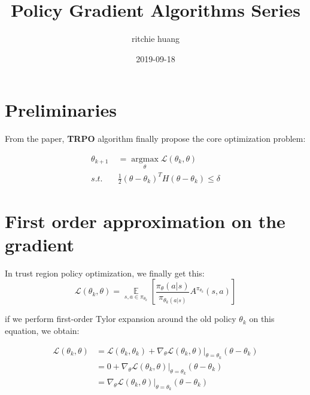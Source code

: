 \documentclass[a4paper, titlepage, 12pt]{article}
\title{Policy Gradient Algorithms Series}
\author{ritchie huang}
\date{2019-09-18}
\begin{document}
\maketitle 

\tableofcontents
\newpage

\section{Preliminaries}
From the paper, \textbf{TRPO} algorithm finally propose the core optimization problem:

\begin{equation}
    \begin{aligned}
    \theta_{k + 1} &= \mathop{argmax} \limits_{\theta} \mathcal{L}(\theta_{k}, \theta) \\
               s.t.\quad&\frac{1}{2} (\theta - \theta_{k})^{T} H (\theta - \theta_{k}) \leq \delta 
    \end{aligned}
\end{equation}

\section{First order approximation on the gradient}
In trust region policy optimization, we finally get this:
\begin{equation}
    \mathcal{L}(\theta_{k}, \theta) = \mathop{\mathbb{E}} \limits_{s, a \in \pi_{\theta_k}} \left[ \frac{\pi_{\theta}(a | s)}{\pi_{\theta_{k}(a | s)}} A^{\pi_{\theta_{k}}}(s, a) \right]
\end{equation}

if we perform first-order Tylor expansion around the old policy $\theta_{k}$ on this equation, we obtain:

\begin{equation}
    \begin{aligned}
    \mathcal{L}(\theta_{k}, \theta) &= \mathcal{L}(\theta_{k}, \theta_{k}) + \nabla_{\theta} \mathcal{L}(\theta_{k}, \theta) |_{\theta = \theta_{k}} (\theta - \theta_{k}) \\
                                    &= 0 + \nabla_{\theta} \mathcal{L}(\theta_{k}, \theta) |_{\theta = \theta_{k}} (\theta - \theta_{k}) \\
                                    &= \nabla_{\theta} \mathcal{L}(\theta_{k}, \theta) |_{\theta = \theta_{k}} (\theta - \theta_{k})
    \end{aligned}
\end{equation}
\end{document}
